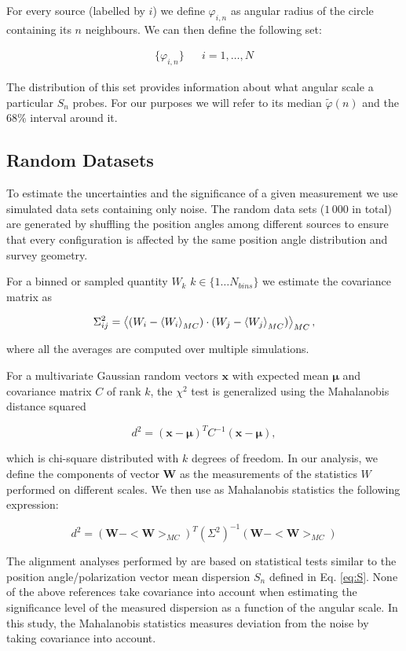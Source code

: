 		For every source (labelled by $i$) we define $\varphi_{i, n}$ as angular radius of the circle containing its $n$ neighbours. We can then define the following set:
		
		\begin{align}
		\{\varphi_{i, n}\} && i =1, \dots, N
		\label{eq:phii}
		\end{align}
		
		The distribution of this set provides information about what angular scale a particular $S_n$ probes. For our purposes we will refer to its median $\tilde{\varphi}(n)$ and the $68\%$ interval around it. 
		
		
		\subsection{Random Datasets}
		\label{sec:RandomDatasets}
		
		To estimate the uncertainties and the significance of a given measurement we use simulated data sets containing only noise. The random data sets ($1\,000$ in total) are generated by shuffling the position angles among different sources to ensure that every configuration is affected by the same position angle distribution and survey geometry. 
		
		For a binned or sampled quantity $W_k$ $k\in \{1\dots N_{bins}\}$ we estimate the covariance matrix as
		
		\begin{equation}
		\Sigma^2_{ij} = \left\langle (W_i - \left\langle W_i \right\rangle_{MC} )\cdot (W_j - \left\langle W_j \right\rangle_{MC}) \right\rangle_{MC},
		\label{eq:cov}
		\end{equation}
		
		where all the averages are computed over multiple simulations.
		
		For a multivariate Gaussian random vectors $\bm{x}$ with expected mean $\bm{\mu}$ and covariance matrix $C$ of rank $k$, the $\chi^2$ test is generalized using the Mahalanobis distance squared
		
		\begin{equation}
		d^2 = (\bm{x} - \bm{\mu})^T C^{-1} (\bm{x} - \bm{\mu}),
		\end{equation}
		
		which is chi-square distributed with $k$ degrees of freedom. In our analysis, we define the components of vector $\bm{W}$ as the measurements of the statistics $W$ performed on different scales. We then use as Mahalanobis statistics the following expression:
		
		\begin{equation}
		d^2 = (\bm{W}-<\bm{W}>_{MC})^T (\Sigma^2)^{-1} (\bm{W}-<\bm{W}>_{MC})
		\label{eq:Maha}
		\end{equation}
		
		The alignment analyses performed by \cite{Jain2004, Hutsemekers2014, Taylor2016} are based on statistical tests similar to the position angle/polarization vector mean dispersion $S_n$ defined in Eq. \eqref{eq:S}.  None of the above references take covariance into account when estimating the significance level of the measured dispersion as a function of the angular scale. In this study, the Mahalanobis statistics measures deviation from the noise by taking covariance into account.
